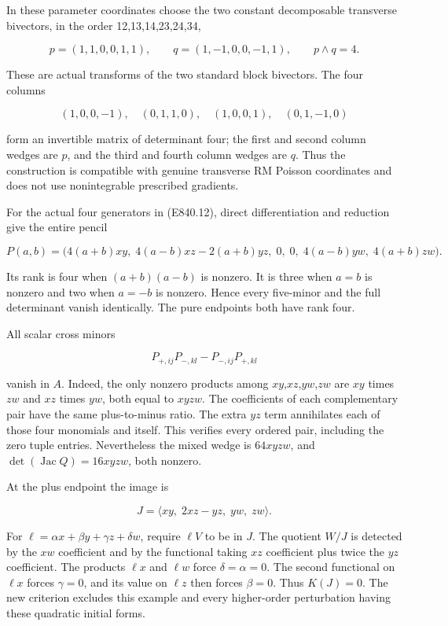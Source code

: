 In these parameter coordinates choose the two constant decomposable
transverse bivectors, in the order 12,13,14,23,24,34,

\[
 p=(1,1,0,0,1,1),\qquad
 q=(1,-1,0,0,-1,1),\qquad p\wedge q=4.
 \tag{E840.13}
\]

These are actual transforms of the two standard block bivectors. The
four columns

\[
 (1,0,0,-1),\quad(0,1,1,0),\quad
 (1,0,0,1),\quad(0,1,-1,0)
 \tag{E840.14}
\]

form an invertible matrix of determinant four; the first and second
column wedges are \(p\), and the third and fourth column wedges are
\(q\). Thus the construction is compatible with genuine transverse RM
Poisson coordinates and does not use nonintegrable prescribed gradients.

For the actual four generators in (E840.12), direct differentiation and
reduction give the entire pencil

\[
 P(a,b)=\bigl(4(a+b)xy,\;
 4(a-b)xz-2(a+b)yz,\;0,\;0,\;
 4(a-b)yw,\;4(a+b)zw\bigr).
 \tag{E840.15}
\]

Its rank is four when \((a+b)(a-b)\) is nonzero. It is three when
\(a=b\) is nonzero and two when \(a=-b\) is nonzero. Hence every
five-minor and the full determinant vanish identically. The pure
endpoints both have rank four.

All scalar cross minors

\[
             P_{+,ij}P_{-,kl}-P_{-,ij}P_{+,kl}
 \tag{E840.16}
\]

vanish in \(A\). Indeed, the only nonzero products among
\(xy\),\(xz\),\(yw\),\(zw\) are \(xy\) times \(zw\) and \(xz\) times
\(yw\), both equal to \(xyzw\). The coefficients of each complementary
pair have the same plus-to-minus ratio. The extra \(yz\) term
annihilates each of those four monomials and itself. This verifies every
ordered pair, including the zero tuple entries. Nevertheless the mixed
wedge is \(64xyzw\), and \(\det(\operatorname{Jac}Q)=16xyzw\), both
nonzero.

At the plus endpoint the image is

\[
                   J=\langle xy,\;2xz-yz,\;yw,\;zw\rangle.
 \tag{E840.17}
\]

For \(\ell=\alpha x+\beta y+\gamma z+\delta w\), require \(\ell V\) to
be in \(J\). The quotient \(W/J\) is detected by the \(xw\) coefficient
and by the functional taking \(xz\) coefficient plus twice the \(yz\)
coefficient. The products \(\ell x\) and \(\ell w\) force
\(\delta=\alpha=0\). The second functional on \(\ell x\) forces
\(\gamma=0\), and its value on \(\ell z\) then forces \(\beta=0\). Thus
\(K(J)=0\). The new criterion excludes this example and every
higher-order perturbation having these quadratic initial forms.


